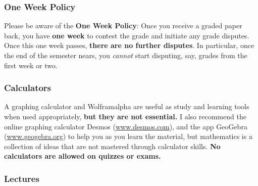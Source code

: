 \documentclass{ximeraXloud}
\begin{document}
\subsubsection*{One Week Policy}

    Please be aware of the \textbf{One Week Policy}: Once you receive a graded paper back, you have \textbf{one week} to contest the grade and initiate any grade disputes. Once this one week passes, \textbf{there are no further disputes}. In particular, once the end of the semester nears, you \textit{cannot} start disputing, say, grades from the first week or two. 


\subsubsection*{Calculators}
    A graphing calculator and Wolframalpha are useful as study and learning tools when used appropriately, \textbf{but they are not essential.}  I also recommend the online graphing calculator Desmos (\url{www.desmos.com}), and the app GeoGebra (\url{www.geogebra.org}) to help you as you learn the material, but mathematics is a collection of ideas that are not mastered through calculator skills.  \textbf{No calculators are allowed on quizzes or exams.}

\subsubsection*{Lectures}
\end{document}
